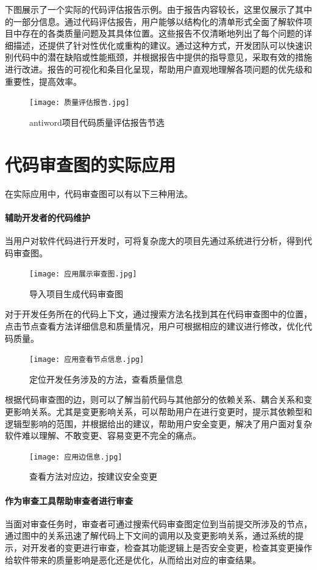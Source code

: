 下图展示了一个实际的代码评估报告示例。由于报告内容较长，这里仅展示了其中的一部分信息。通过代码评估报告，用户能够以结构化的清单形式全面了解软件项目中存在的各类质量问题及其具体位置。这些报告不仅清晰地列出了每个问题的详细描述，还提供了针对性优化或重构的建议。通过这种方式，开发团队可以快速识别代码中的潜在缺陷或性能瓶颈，并根据报告中提供的指导意见，采取有效的措施进行改进。报告的可视化和条目化呈现，帮助用户直观地理解各项问题的优先级和重要性，提高效率。

\begin{figure}[h]
\centering
\texttt{[image: 质量评估报告.jpg]}
\caption{antiword项目代码质量评估报告节选}
\end{figure}


\section{代码审查图的实际应用}

在实际应用中，代码审查图可以有以下三种用法。

\paragraph{辅助开发者的代码维护} 当用户对软件代码进行开发时，可将复杂庞大的项目先通过系统进行分析，得到代码审查图。

\begin{figure}[h]
\centering
\texttt{[image: 应用展示审查图.jpg]}
\caption{导入项目生成代码审查图}
\end{figure}

对于开发任务所在的代码上下文，通过搜索方法名找到其在代码审查图中的位置，点击节点查看方法详细信息和质量情况，用户可根据相应的建议进行修改，优化代码质量。

\begin{figure}[h]
\centering
\texttt{[image: 应用查看节点信息.jpg]}
\caption{定位开发任务涉及的方法，查看质量信息}
\end{figure}

根据代码审查图的边，则可以了解当前代码与其他部分的依赖关系、耦合关系和变更影响关系。尤其是变更影响关系，可以帮助用户在进行变更时，提示其依赖型和逻辑型影响的范围，并根据给出的建议，帮助用户安全变更，解决了用户面对复杂软件难以理解、不敢变更、容易变更不完全的痛点。

\begin{figure}[h]
\centering
\texttt{[image: 应用边信息.jpg]}
\caption{查看方法对应边，按建议安全变更}
\end{figure}

\paragraph{作为审查工具帮助审查者进行审查} 当面对审查任务时，审查者可通过搜索代码审查图定位到当前提交所涉及的节点，通过图中的关系迅速了解代码上下文间的调用以及变更影响关系，通过系统的提示，对开发者的变更进行审查，检查其功能逻辑上是否安全变更，检查其变更操作给软件带来的质量影响是恶化还是优化，从而给出对应的审查结果。

